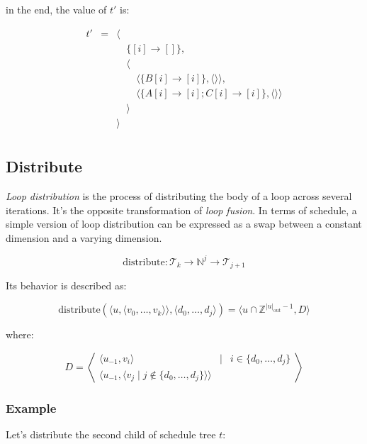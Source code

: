 \documentclass{article}
\begin{document}
\noindent in the end, the value of $t'$ is:

\[
    \begin{array}{lcl}
        t'&=& \langle \\
          & & \quad\{[i] \rightarrow [] \},\\
          & & \quad\langle \\
          & & \quad\quad \langle\{ B[i] \rightarrow [i] \}, \langle\rangle\rangle,\\
          & & \quad\quad \langle\{ A[i] \rightarrow [i]; C[i] \rightarrow [i] \}, \langle\rangle\rangle\\
          & & \quad\rangle \\
          & & \rangle \\
    \end{array}
\]


\subsection{Distribute}

\emph{Loop distribution} is the process of distributing the body of a loop
across several iterations. It's the opposite transformation of \emph{loop
fusion}. In terms of schedule, a simple version of loop distribution can be
expressed as a swap between a constant dimension and a varying dimension.

\[
    \mathrm{distribute}: \mathcal{T}_k \rightarrow \mathbb{N}^j \rightarrow \mathcal{T}_{j+1}
\]

Its behavior is described as:

\[
    \mathrm{distribute}(\langle  u, \langle v_0, \ldots, v_k\rangle \rangle, \langle d_0, \ldots, d_j\rangle) = \langle u \cap \mathbb{Z}^{|u|_\mathrm{out}-1}, D\rangle
\]

\noindent where:

\[
    D = \left\langle 
    \begin{array}{ccl}
        \langle  u_{-1}, v_i \rangle & \mid & i \in \{ d_0, \ldots, d_j\} \\
        \langle  u_{-1}, \langle  v_j \mid j \not\in \{ d_0, \ldots, d_j\}\rangle \rangle  & & 
    \end{array}
    \right\rangle
\]

\subsubsection*{Example}

Let's distribute the second child of schedule tree $t$:
\end{document}
